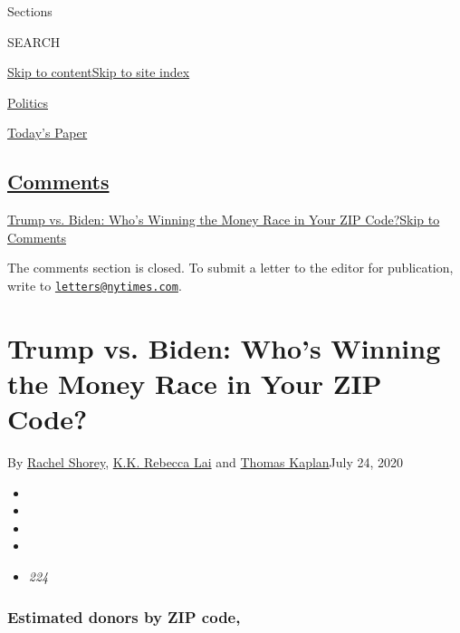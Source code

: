 Sections

SEARCH

\protect\hyperlink{site-content}{Skip to
content}\protect\hyperlink{site-index}{Skip to site index}

\href{https://www.nytimes.com/section/politics}{Politics}

\href{https://myaccount.nytimes.com/auth/login?response_type=cookie\&client_id=vi}{}

\href{https://www.nytimes.com/section/todayspaper}{Today's Paper}

\hypertarget{comments}{%
\subsection{\texorpdfstring{\protect\hyperlink{commentsContainer}{Comments}}{Comments}}\label{comments}}

\href{}{Trump vs. Biden: Who's Winning the Money Race in Your ZIP
Code?}\href{}{Skip to Comments}

The comments section is closed. To submit a letter to the editor for
publication, write to
\href{mailto:letters@nytimes.com}{\nolinkurl{letters@nytimes.com}}.

\hypertarget{trump-vs-biden-whos-winning-the-money-race-in-your-zip-code}{%
\section{Trump vs. Biden: Who's Winning the Money Race in Your ZIP
Code?}\label{trump-vs-biden-whos-winning-the-money-race-in-your-zip-code}}

By \href{https://www.nytimes.com/by/rachel-shorey}{Rachel Shorey},
\href{https://www.nytimes.com/by/kk-rebecca-lai}{K.K. Rebecca Lai} and
\href{https://www.nytimes.com/by/thomas-kaplan}{Thomas Kaplan}July 24,
2020

\begin{itemize}
\item
\item
\item
\item
\item
  \emph{224}
\end{itemize}

\hypertarget{estimated-donors-by-zip-code}{%
\subsubsection{Estimated donors by ZIP
code,}\label{estimated-donors-by-zip-code}}

